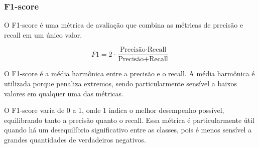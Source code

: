 \subsubsection{F1-score}

O F1-score é uma métrica de avaliação que combina as métricas de precisão e recall em um único valor. 

\begin{equation}
  F1 = 2 \cdot \frac{\text{Precisão} \cdot \text{Recall}}{\text{Precisão} + \text{Recall}}
\end{equation}

O F1-score é a média harmônica entre a precisão e o recall. A média harmônica é utilizada porque penaliza extremos, 
sendo particularmente sensível a baixos valores em qualquer uma das métricas.

O F1-score varia de 0 a 1, onde 1 indica o melhor desempenho possível, equilibrando tanto a precisão quanto o recall.
Essa métrica é particularmente útil quando há um desequilíbrio significativo entre as classes, 
pois é menos sensível a grandes quantidades de verdadeiros negativos.